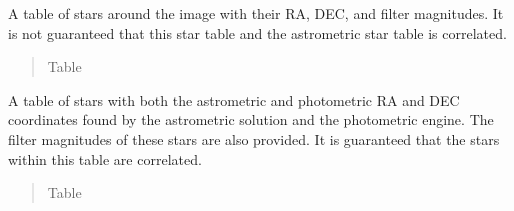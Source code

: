 \documentclass[letterpaper,11pt,english]{sphinxmanual}
\begin{document}
\begin{savenotes}
\begin{fulllineitems}

\begin{savenotes}\begin{fulllineitems}
\label{\detokenize{code/opihiexarata.photometry.solution:opihiexarata.photometry.solution.PhotometricSolution.star_table}}
\pysigstartsignatures
{}
\pysigstopsignatures
\sphinxAtStartPar
A table of stars around the image with their RA, DEC, and filter
magnitudes. It is not guaranteed that this star table and the
astrometric star table is correlated.
\begin{quote}\begin{description}
\sphinxAtStartPar
Table

\end{description}\end{quote}

\end{fulllineitems}\end{savenotes}


\begin{savenotes}\begin{fulllineitems}
\label{\detokenize{code/opihiexarata.photometry.solution:opihiexarata.photometry.solution.PhotometricSolution.intersection_star_table}}
\pysigstartsignatures
{}
\pysigstopsignatures
\sphinxAtStartPar
A table of stars with both the astrometric and photometric RA and DEC
coordinates found by the astrometric solution and the photometric
engine. The filter magnitudes of these stars are also provided. It is
guaranteed that the stars within this table are correlated.
\begin{quote}\begin{description}
\sphinxAtStartPar
Table

\end{description}\end{quote}

\end{fulllineitems}\end{savenotes}


\end{fulllineitems}
\end{savenotes}
\end{document}
